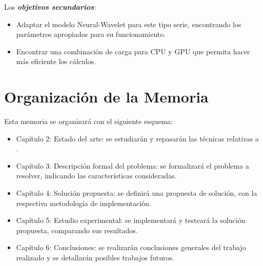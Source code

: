 Los \emph{\textbf{objetivos secundarios}}:
\begin{itemize}
	\item Adaptar el modelo Neural-Wavelet para este tipo serie, encontrando los parámetros apropiados para su funcionamiento.
	\item Encontrar una combinación de carga para CPU y GPU que permita hacer más eficiente los cálculos.
\end{itemize}

\section{Organización de la Memoria}

Esta memoria se organizará con el siguiente esquema:
\begin{itemize}
	\item Capítulo 2: Estado del arte: se estudiarán y repasarán las técnicas relativas a .
	\item Capítulo 3: Descripción formal del problema: se formalizará el problema a resolver, indicando las características consideradas.
	\item Capítulo 4: Solución propuesta: se definirá una propuesta de solución, con la respectiva metodología de implementación. 
	\item Capítulo 5: Estudio experimental: se implementará y testeará la solución propuesta, comparando sus resultados.
	\item Capítulo 6: Conclusiones: se realizarán conclusiones generales del trabajo realizado y se detallarán posibles trabajos futuros.
\end{itemize}
